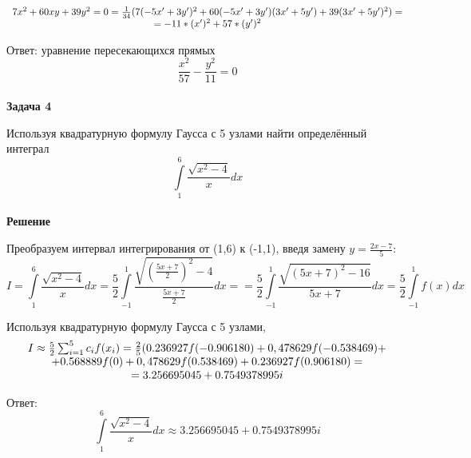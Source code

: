 \documentclass[12pt]{article}
\begin{document}
\begin{flushleft}
$$$$
$$
\begin{array}[c]{cc} 
7x^2 + 60xy +39y^2 = 0 = \frac{1}{34}(7(-5x'+3y')^{2} + 60(-5x'+3y')(3x'+5y') + 39(3x'+5y')^{2}) = \\
=-11*(x')^{2}+57*(y')^{2}
\end{array}
$$
\par{Ответ: уравнение пересекающихся прямых}
$$
\frac{x^{2}}{57} - \frac{y^{2}}{11} = 0
$$\\
\textbf{Задача 4}
\par{Используя квадратурную формулу Гаусса с 5 узлами найти определённый интеграл } 
$$
\int\limits_{1}^{6}{\frac{\sqrt{x^2-4}}{x}}dx
$$\\
\textbf{Решение}
\par{Преобразуем интервал интегрирования от (1,6) к (-1,1), введя замену $y=\frac{2x-7}{5}$}: 
$$I = 
\int\limits_{1}^{6}{\frac{\sqrt{x^2-4}}{x}}dx=
\frac{5}{2}\int\limits_{-1}^{1}{ \frac{\sqrt{\left(\frac{5x+7}{2}\right)^{2}-4}}{\frac{5x+7}{2}}}dx = 
= \frac{5}{2}\int\limits_{-1}^{1}{\frac{\sqrt{(5x+7)^{2}-16}}{5x+7}}dx = \frac{5}{2}\int\limits_{-1}^{1}{f(x)dx}
$$
\par{Используя квадратурную формулу Гаусса с 5 узлами,}
$$
\begin{array}[c]{c}
I \approx \frac{5}{2}\sum_{i=1}^{5}{c_{i}f(x_{i})}= 
 \frac{2}{5}(0.236927f(-0.906180) + 0,478629f(-0.538469) + \\
+0.568889f(0) +0,478629f(0.538469) + 0.236927f(0.906180) = \\
=3.256695045+0.7549378995i
\end{array}
$$
\par{Ответ:}
$$
\int\limits_{1}^{6}{\frac{\sqrt{x^2-4}}{x}}dx \approx 3.256695045+0.7549378995i
$$


\end{flushleft}
\end{document}

